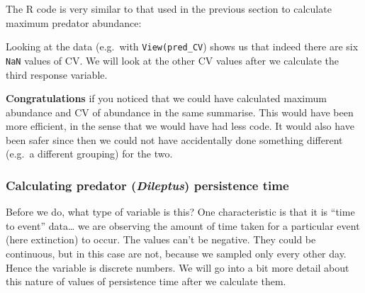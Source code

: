\documentclass[]{book}
\makeatletter
\newenvironment{Shaded}{\begin{snugshade}}{\end{snugshade}}
\newcommand{\DataTypeTok}[1]{\textcolor[rgb]{0.13,0.29,0.53}{#1}}
\newcommand{\DecValTok}[1]{\textcolor[rgb]{0.00,0.00,0.81}{#1}}
\newcommand{\KeywordTok}[1]{\textcolor[rgb]{0.13,0.29,0.53}{\textbf{#1}}}
\newcommand{\NormalTok}[1]{#1}
\newcommand{\OperatorTok}[1]{\textcolor[rgb]{0.81,0.36,0.00}{\textbf{#1}}}
\newcommand{\StringTok}[1]{\textcolor[rgb]{0.31,0.60,0.02}{#1}}
\newenvironment{kframe}{%
\medskip{}
\setlength{\fboxsep}{.8em}
 \def\at@end@of@kframe{}%
 \ifinner\ifhmode%
  \def\at@end@of@kframe{\end{minipage}}%
  \begin{minipage}{\columnwidth}%
 \fi\fi%
 \def\FrameCommand##1{\hskip\@totalleftmargin \hskip-\fboxsep
 \colorbox{shadecolor}{##1}\hskip-\fboxsep
     \hskip-\linewidth \hskip-\@totalleftmargin \hskip\columnwidth}%
 \MakeFramed {\advance\hsize-\width
   \@totalleftmargin\z@ \linewidth\hsize
   \@setminipage}}%
 {\par\unskip\endMakeFramed%
 \at@end@of@kframe}
\newenvironment{rmdblock}[1]
  {
  \begin{itemize}
  \renewcommand{\labelitemi}{
    \raisebox{-.7\height}[0pt][0pt]{
      {\setkeys{Gin}{width=3em,keepaspectratio}\texttt{[image: images/\#1]}}
    }
  }
  \setlength{\fboxsep}{1em}
  \begin{kframe}
  \item
  }
  {
  \end{kframe}
  \end{itemize}
  }
\newenvironment{efficiency}
  {\begin{rmdblock}{efficiency}}
  {\end{rmdblock}}
\makeatother
\begin{document}
The R code is very similar to that used in the previous section to calculate maximum predator abundance:

\begin{Shaded}
\end{Shaded}

Looking at the data (e.g.~with \texttt{View(pred\_CV}) shows us that indeed there are six \texttt{NaN} values of CV. We will look at the other CV values after we calculate the third response variable.

\begin{efficiency}
\textbf{Congratulations} if you noticed that we could have calculated
maximum abundance and CV of abundance in the same summarise. This would
have been more efficient, in the sense that we would have had less code.
It would also have been safer since then we could not have accidentally
done something different (e.g.~a different grouping) for the two.
\end{efficiency}

\hypertarget{calculating-predator-dileptus-persistence-time}{%
\subsubsection{\texorpdfstring{Calculating predator (\emph{Dileptus}) persistence time}{Calculating predator (Dileptus) persistence time}}\label{calculating-predator-dileptus-persistence-time}}

Before we do, what type of variable is this? One characteristic is that it is ``time to event'' data\ldots{} we are observing the amount of time taken for a particular event (here extinction) to occur. The values can't be negative. They could be continuous, but in this case are not, because we sampled only every other day. Hence the variable is discrete numbers. We will go into a bit more detail about this nature of values of persistence time after we calculate them.
\end{document}
